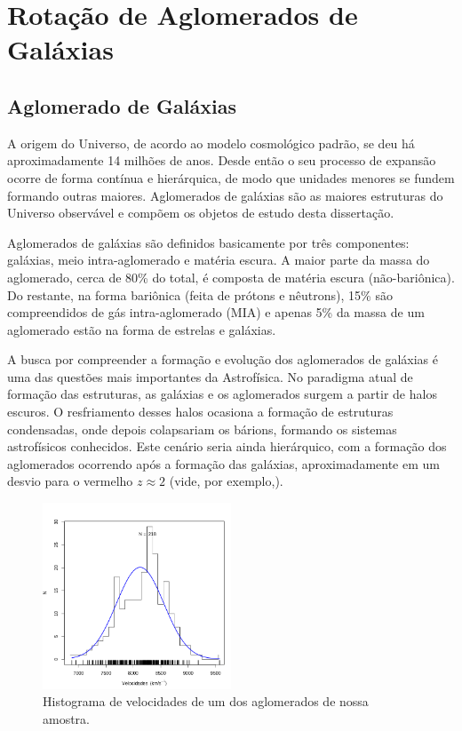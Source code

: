 
\chapter{Rotação de Aglomerados de Galáxias}
\section{Aglomerado de Galáxias}
A origem do Universo, de acordo ao modelo cosmológico padrão, se deu há aproximadamente 14 milhões de anos. Desde então o seu processo de expansão ocorre de forma contínua e hierárquica, de modo que unidades menores se fundem formando outras maiores. Aglomerados de galáxias são as maiores estruturas do Universo observável e compõem os objetos de estudo desta dissertação.  

Aglomerados de galáxias são definidos basicamente por três componentes: galáxias, meio intra-aglomerado e matéria escura. A maior parte da massa do aglomerado, cerca de 80\% do total, é composta de matéria escura (não-bariônica). Do restante, na forma bariônica (feita de prótons e nêutrons), 15\% são compreendidos de gás intra-aglomerado (MIA) e apenas 5\% da massa de um aglomerado estão na forma de estrelas e galáxias.

A busca por compreender a formação e evolução dos aglomerados de galáxias é uma das questões mais importantes da Astrofísica. No paradigma atual de formação das estruturas, as galáxias e os aglomerados surgem a partir de halos escuros. O resfriamento desses halos ocasiona a formação de estruturas condensadas, onde depois colapsariam os bárions, formando  os sistemas astrofísicos conhecidos. Este cenário seria ainda hierárquico, com a formação dos aglomerados ocorrendo após a formação das galáxias, aproximadamente em um desvio para o vermelho $z \approx 2$ (vide, por exemplo,).
\begin{figure}[H]
	\centering
	\includegraphics[width=0.5\textwidth]{04-figuras/10043dist}
	\caption{Histograma de velocidades de um dos aglomerados de nossa amostra.}
	\label{fig1}
\end{figure}

